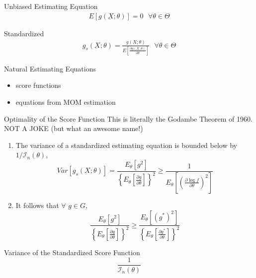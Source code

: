 \documentclass[avery5388,grid,frame]{flashcards}
\begin{document}
\begin{flashcard}[Definition]{Unbiased Estimating Equation}
\bigskip\bigskip\bigskip
{\begin{align*}
E[g(\underbar{X};\theta)]=0\textrm{  }\forall\theta\in\Theta
\end{align*}}
\end{flashcard}
\begin{flashcard}[Definition]{Standardized}
\bigskip\bigskip\bigskip
{\begin{align*}
g_s(\underbar{X};\theta)=\frac{g(\underbar{X};\theta)}{E\left[\frac{\partial g(\underbar{X};\theta)}{\partial\theta}\right] }\textrm{  } \forall\theta\in\Theta
\end{align*}}
\end{flashcard}
\begin{flashcard}[Examples]{Natural Estimating Equations}
\bigskip\bigskip\bigskip
\begin{itemize}
\item score functions
\item equations from MOM estimation
\end{itemize}
\end{flashcard}
\begin{flashcard}[Theorem]{Optimality of the Score Function}
\bigskip
This is literally the Godambe Theorem of 1960. NOT A JOKE (but what an awesome name!)
\begin{enumerate}
\item The variance of a standardized estimating equation is bounded below by $1/\mathcal{I}_n(\theta)$,
\begin{equation*}
Var[g_s(\underbar{X};\theta)]=\frac{E_\theta[g^2]}{\left\{E_\theta\left[\frac{\partial g}{\partial\theta}\right]\right\}^2}\geq\frac{1}{E_\theta\left[\left(\frac{\partial\log f}{\partial\theta}\right)^2\right]}
\end{equation*}
\item It follows that $\forall$ $g\in G$,
\begin{equation*}
\frac{E_\theta[g^2]}{\left\{E_\theta\left[\frac{\partial g}{\partial\theta}\right]\right\}^2}\geq\frac{E_\theta[(g^*)^2]}{\left\{E_\theta\left[\frac{\partial g^*}{\partial\theta}\right]\right\}^2}
\end{equation*}
\end{enumerate}
\end{flashcard}
\begin{flashcard}[Definition]{Variance of the Standardized Score Function}
\bigskip\bigskip\bigskip
\begin{equation*}
\frac{1}{\mathcal{I}_n(\theta)}
\end{equation*}
\end{flashcard}
\end{document}
